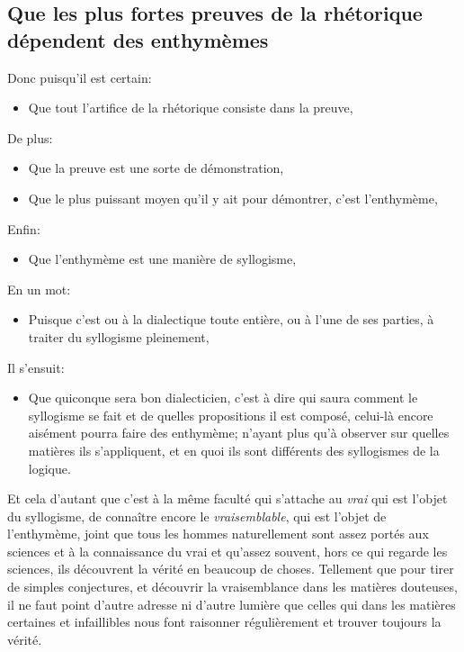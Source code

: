 \subsection{Que les plus fortes preuves de la rhétorique dépendent des enthymèmes}

Donc puisqu'il est certain:

\begin{itemize}
\item  Que tout l'artifice de la rhétorique consiste dans la preuve,
\end{itemize}

De plus:

\begin{itemize}
\item  Que la preuve est une sorte de démonstration,
\item  Que le plus puissant moyen qu'il y ait pour démontrer, c'est l'enthymème,
\end{itemize}

Enfin:

\begin{itemize}
\item  Que l'enthymème est une manière de syllogisme,
\end{itemize}

En un mot:

\begin{itemize}
\item  Puisque c'est ou à la dialectique toute entière, ou à l'une de ses parties, à traiter du syllogisme pleinement,
\end{itemize}

Il s'ensuit:

\begin{itemize}
\item  Que quiconque sera bon dialecticien, c'est à dire qui saura comment le syllogisme se fait et de quelles propositions il est composé,
             celui-là encore aisément pourra faire des enthymème; n'ayant plus qu'à observer sur quelles matières ils s'appliquent, et en quoi ils
             sont différents des syllogismes de la logique.
\end{itemize}

Et cela d'autant que c'est à la même faculté qui s'attache au \emph{vrai} qui est l'objet du syllogisme, de connaître encore le \emph{vraisemblable},
qui est l'objet de l'enthymème, joint que tous les hommes naturellement sont assez portés aux sciences et à la connaissance du vrai et qu'assez
souvent, hors ce qui regarde les sciences, ils découvrent la vérité en beaucoup de choses. Tellement que pour tirer de simples conjectures, et
découvrir la vraisemblance dans les matières douteuses, il ne faut point d'autre adresse ni d'autre lumière que celles qui dans les matières
certaines et infaillibles nous font raisonner régulièrement et trouver toujours la vérité.

